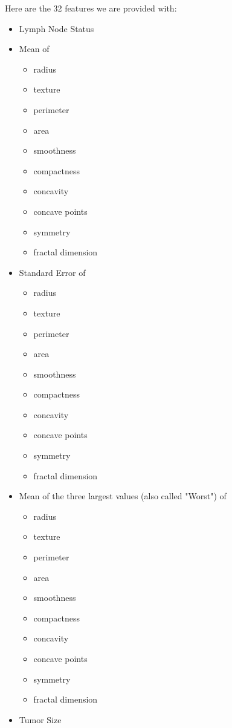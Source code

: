 \documentclass[]{report}
\begin{document}
Here are the 32 features we are provided with:  
\begin{itemize}
	\item Lymph Node Status
	
	\item Mean of 
		\begin{itemize}
			\item radius
			\item texture
			\item perimeter
			\item area
			\item smoothness
			\item compactness
			\item concavity
			\item concave points
			\item symmetry
			\item fractal dimension
		\end{itemize}
	
	\item Standard Error of 
		\begin{itemize}
		\item radius
		\item texture
		\item perimeter
		\item area
		\item smoothness
		\item compactness
		\item concavity
		\item concave points
		\item symmetry
		\item fractal dimension
	\end{itemize}

	\item Mean of the three largest values (also called "Worst") of 
		\begin{itemize}
		\item radius
		\item texture
		\item perimeter
		\item area
		\item smoothness
		\item compactness
		\item concavity
		\item concave points
		\item symmetry
		\item fractal dimension
	\end{itemize}

	\item Tumor Size
\end{itemize}
\end{document}
